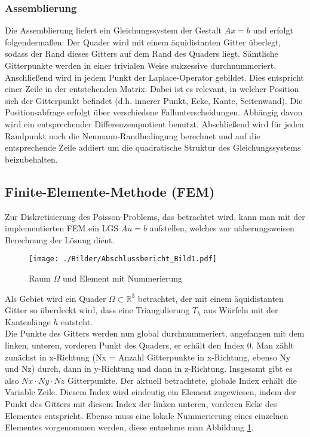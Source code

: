 \subsubsection{Assemblierung}
Die Assemblierung liefert ein Gleichungssystem der Gestalt $Ax=b$ und erfolgt folgendermaßen:
Der Quader wird mit einem äquidistanten Gitter überlegt, sodass der Rand dieses Gitters auf dem Rand des Quaders liegt.
Sämtliche Gitterpunkte werden in einer trivialen Weise sukzessive durchnummeriert.
Anschließend wird in jedem Punkt der Laplace-Operator gebildet. Dies entspricht einer Zeile in der entstehenden Matrix. Dabei ist es relevant, in welcher Position sich der Gitterpunkt befindet (d.h. innerer Punkt, Ecke, Kante, Seitenwand).
Die Positionsabfrage erfolgt über verschiedene Fallunterscheidungen. Abhängig davon wird
ein entsprechender Differenzenquotient benutzt.
Abschließend wird für jeden Randpunkt noch die Neumann-Randbedingung berechnet und auf die entsprechende Zeile addiert um die quadratische Struktur des Gleichungssystems beizubehalten.

 
\subsection{Finite-Elemente-Methode (FEM)}
Zur Diskretisierung des Poisson-Problems, das betrachtet wird, kann man mit der implementierten FEM ein LGS $A u = b$ aufstellen, welches zur näherungsweisen Berechnung der Lösung dient. \\

\begin{figure}[h]
	\begin{center}
		\texttt{[image: ./Bilder/Abschlussbericht\_Bild1.pdf]}
		
		\caption{Raum $\Omega$ und Element mit Nummerierung}\label{draft}
	\end{center}
\end{figure}

Als Gebiet wird ein Quader $\Omega \subset \mathbb{R}^{3}$ betrachtet, der mit einem äquidistanten Gitter so überdeckt wird, dass eine Triangulierung $T_h$ aus Würfeln mit der Kantenlänge $h$ entsteht. \\
Die Punkte des Gitters werden nun global durchnummeriert, angefangen mit dem linken, unteren, vorderen Punkt des Quaders, er erhält den Index 0. Man zählt zunächst in x-Richtung (Nx = Anzahl Gitterpunkte in x-Richtung, ebenso Ny und Nz) durch, dann in y-Richtung und dann in z-Richtung. Insgesamt gibt es also $Nx \cdot Ny \cdot Nz$ Gitterpunkte. Der aktuell betrachtete, globale Index erhält die Variable \glqq Zeile\grqq. Diesem Index wird eindeutig ein Element zugewiesen, indem der Punkt des Gitters mit diesem Index der linken unteren, vorderen Ecke des Elementes entspricht. Ebenso muss eine lokale Nummerierung eines einzelnen Elementes vorgenommen werden, diese entnehme man Abbildung \ref{draft}.\\

